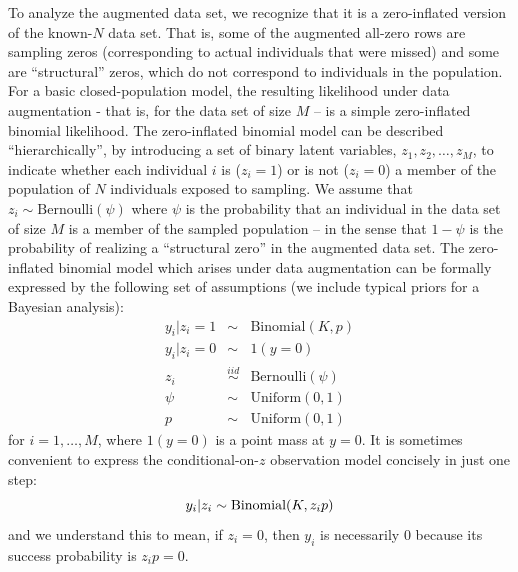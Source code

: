 To analyze the augmented data set, we recognize that it is a
zero-inflated version of the known-$N$ data set. That is, some of the
augmented all-zero rows are sampling zeros (corresponding to actual
individuals that were missed) and some are ``structural'' zeros, which
do not correspond to individuals in the population. For a basic
closed-population model, the resulting likelihood under data
augmentation - that is, for the data set of size $M$ -- is a simple
zero-inflated binomial likelihood.  The zero-inflated binomial model
can be described ``hierarchically'', by introducing a set of binary
latent variables, $z_{1},z_{2},\ldots, z_{M}$, to indicate whether
each individual $i$ is ($z_i=1$) or is not ($z_i=0$) a member of the
population of $N$ individuals exposed to sampling. We assume that
$z_{i} \sim \mbox{Bernoulli}(\psi)$ where $\psi$ is the probability that an
individual in the data set of size $M$ is a member of the sampled
population -- in the sense that $1-\psi$ is the probability of
realizing a ``structural zero'' in the augmented data set.  The
zero-inflated binomial model which arises under data augmentation can
be formally expressed by the following set of assumptions (we include
typical priors for a Bayesian analysis):
\begin{eqnarray*}
 y_{i}|{z_{i}=1} & \sim  &\mbox{Binomial}(K, p) \\
 y_{i}|{z_{i}=0} & \sim &  1(y=0)  \\
 z_{i} & \stackrel{iid}{\sim} & \mbox{Bernoulli}(\psi) \\
 \psi & \sim & \mathrm{Uniform}(0,1) \\
 p & \sim & \mathrm{Uniform}(0,1)
\end{eqnarray*}
for $i=1, \ldots, M$, where $1(y=0)$ is a point mass at
$y=0$.
It is sometimes convenient to express the conditional-on-$z$
observation model concisely in
just one step:
\[
 y_{i}|z_{i}  \sim  \mbox{Binomial}(K, z_{i} p) \\
\]
and we understand this to mean, if $z_{i}=0$, then $y_{i}$ is
necessarily 0 because its success probability is $z_{i} p = 0$.

